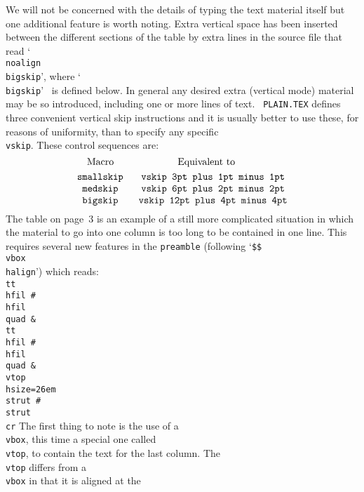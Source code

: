 We will not be concerned with the details of typing the text material itself but
one additional feature is worth  noting.  Extra vertical space has been inserted
between the different sections of the table by extra lines in the source file
that read `{\tt \\noalign~\lbr\\bigskip\rbr}', where `{\tt \\bigskip}'
\ is defined below.  In general any desired extra (vertical mode) material
may be so introduced, including one or more lines of text.  {\tt
PLAIN.TEX} defines three convenient vertical skip instructions and it is
usually better to use these, for reasons of uniformity, than to specify any
specific {\tt \\vskip}. These control sequences are:
$$\vbox{\halign{#\quad\hfil&#\hfil\cr
\quad Macro&\qquad \qquad Equivalent to\cr
\noalign{\smallskip}
\tt \\smallskip &\tt \\vskip 3pt plus 1pt minus 1pt\cr
\tt \\medskip &\tt \\vskip 6pt plus 2pt minus 2pt\cr
\tt \\bigskip &\tt \\vskip 12pt plus 4pt minus 4pt\cr}}$$
The table on page~3 is an example of a still more
complicated situation in which the material to
go into one column is too long to be contained in one line.
This requires several new features in the {\tt preamble} 
(following `{\tt \$\$\\vbox\lbr\\halign\lbr}')
which reads:
\smallskip 
{\tt \obeylines \parskip 0pt 
\\tt \\hfil \#\\hfil \\quad \& \\tt \\hfil \#\\hfil \\quad \&
\\vtop \lbr\\hsize=26em \\strut \#\\strut\rbr\\cr}
\smallskip
The first thing to note is the use of a {\tt \\vbox}, this time a special
one called {\tt \\vtop}, to contain the text for the last column.  The
{\tt \\vtop} differs from a {\tt \\vbox} in that it is aligned at the
